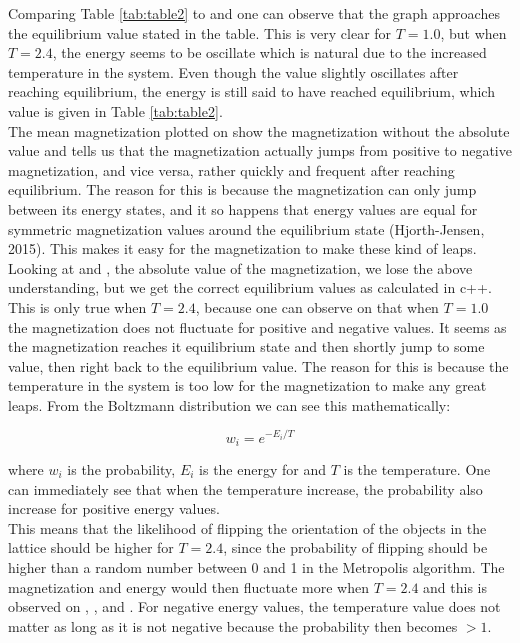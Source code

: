\documentclass[10pt,a4paper]{article}
\begin{document}
\noindent Comparing Table \ref{tab:table2} to  and  one can observe that the graph approaches the equilibrium value stated in the table. This is very clear for $T = 1.0$, but when $T = 2.4$, the energy seems to be oscillate which is natural due to the increased temperature in the system. Even though the value slightly oscillates after reaching equilibrium, the energy is still said to have reached equilibrium, which value is given in Table \ref{tab:table2}.\\

\noindent The mean magnetization plotted on  show the magnetization without the absolute value and tells us that the magnetization actually jumps from positive to negative magnetization, and vice versa, rather quickly and frequent after reaching equilibrium. The reason for this is because the magnetization can only jump between its energy states, and it so happens that energy values are equal for symmetric magnetization values around the equilibrium state (Hjorth-Jensen, 2015). This makes it easy for the magnetization to make these kind of leaps. Looking at  and , the absolute value of the magnetization, we lose the above understanding, but we get the correct equilibrium values as calculated in c++.\\

\noindent This is only true when $T = 2.4$, because one can observe on  that when $T = 1.0$ the magnetization does not fluctuate for positive and negative values. It seems as the magnetization reaches it equilibrium state and then shortly jump to some value, then right back to the equilibrium value. The reason for this is because the temperature in the system is too low for the magnetization to make any great leaps. From the Boltzmann distribution we can see this mathematically:

$$
w_i = e^{-E_i/T}
$$

\noindent where $w_i$ is the probability, $E_i$ is the energy for and $T$ is the temperature. One can immediately see that when the temperature increase, the probability also increase for positive energy values.\\
This means that the likelihood of flipping the orientation of the objects in the lattice should be higher for $T = 2.4$, since the probability of flipping should be higher than a random number between 0 and 1 in the Metropolis algorithm. The magnetization and energy would then fluctuate more when $T = 2.4$ and this is observed on , ,  and . For negative energy values, the temperature value does not matter as long as it is not negative because the probability then becomes $>1$.\\
\end{document}
